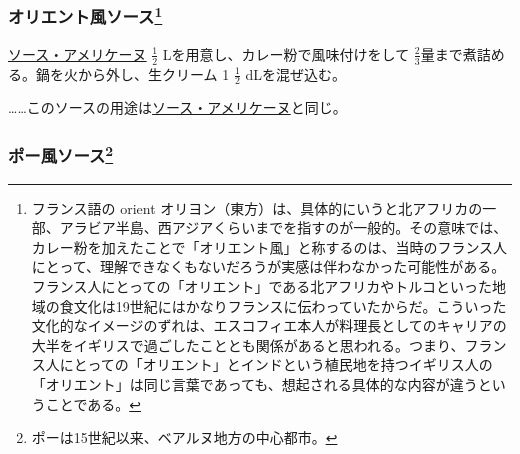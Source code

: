 \begin{recette}
\hypertarget{sauce-orientale}{%
\subsubsection[オリエント風ソース]{\texorpdfstring{オリエント風ソース\footnote{フランス語の
  orient
  オリヨン（東方）は、具体的にいうと北アフリカの一部、アラビア半島、西アジアくらいまでを指すのが一般的。その意味では、カレー粉を加えたことで「オリエント風」と称するのは、当時のフランス人にとって、理解できなくもないだろうが実感は伴わなかった可能性がある。フランス人にとっての「オリエント」である北アフリカやトルコといった地域の食文化は19世紀にはかなりフランスに伝わっていたからだ。こういった文化的なイメージのずれは、エスコフィエ本人が料理長としてのキャリアの大半をイギリスで過ごしたこととも関係があると思われる。つまり、フランス人にとっての「オリエント」とインドという植民地を持つイギリス人の「オリエント」は同じ言葉であっても、想起される具体的な内容が違うということである。}}{オリエント風ソース}}\label{sauce-orientale}}



\protect\hyperlink{sauce-americaine}{ソース・アメリケーヌ}
\(\frac{1}{2}\) Lを用意し、カレー粉で風味付けをして
\(\frac{2}{3}\)量まで煮詰める。鍋を火から外し、生クリーム 1
\(\frac{1}{2}\) dLを混ぜ込む。

\ldots{}\ldots{}このソースの用途は\protect\hyperlink{sauce-americaine}{ソース・アメリケーヌ}と同じ。

\hypertarget{sauce-paloise}{%
\subsubsection[ポー風ソース]{\texorpdfstring{ポー風ソース\footnote{ポーは15世紀以来、ベアルヌ地方の中心都市。}}{ポー風ソース}}\label{sauce-paloise}}




\end{recette}
